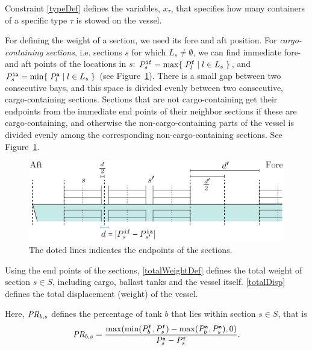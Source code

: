 Constraint \eqref{typeDef} defines the variables, $x_\tau$, that specifies how many containers of a specific type $\tau$ is stowed on the vessel. 

For defining the weight of a section, we need its fore and aft position. For \emph{cargo-containing sections}, i.e. sections $s$ for which $L_s\neq \emptyset$, we can find immediate fore- and aft points of the locations in $s$: $P^{\texttt{if}}_s = \max\{\;{P^{\texttt{f}}_l}\;|\;{l\in L_s}\;\}$, and $P^{\texttt{ia}}_s = \min\{\;{P^{\texttt{a}}_l}\;|\;{l\in L_s}\;\}$ (see Figure~\ref{fig:sections}). 
There is a small gap between two consecutive bays, and this space is divided evenly between two consecutive, cargo-containing sections. %
Sections that are not cargo-containing get their endpoints from the immediate end points of their neighbor sections if these are cargo-containing, and otherwise the non-cargo-containing parts of the vessel is divided evenly among the corresponding non-cargo-containing sections. See Figure~\ref{fig:sections}.

\begin{figure}[htbp]
	\centering
		\includegraphics{figures/sections.pdf}
	\caption{The doted lines indicates the endpoints of the sections.}
	\label{fig:sections}
\end{figure}

Using the end points of the sections, \eqref{totalWeightDef} defines the total weight of section $s\in S$, including cargo, ballast tanks and the vessel itself. \eqref{totalDisp} defines the total displacement (weight) of the vessel.   

Here, $\mathit{PR}_{b,s}$ defines the percentage of tank $b$ %
that lies within section $s\in S$, that is %
\[
\mathit{PR}_{b,s} = \frac{\max(\min(P^\texttt{f}_b, P^\texttt{f}_s)-\max(P^\texttt{a}_b, P^\texttt{a}_s),0)}{P^\texttt{a}_s-P^\texttt{f}_s}.
\]

